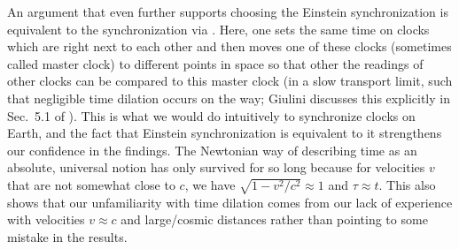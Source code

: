 \documentclass[../relativity_main.tex]{subfiles}
\begin{document}


An argument that even further supports choosing the Einstein synchronization is equivalent to the synchronization via . Here, one sets the same time on clocks which are right next to each other and then moves one of these clocks (sometimes called master clock) to different points in space so that other the readings of other clocks can be compared to this master clock (in a slow transport limit, such that negligible time dilation occurs on the way; Giulini discusses this explicitly in Sec.~5.1 of \cite{giulini_srt}). This is what we would do intuitively to synchronize clocks on Earth, and the fact that Einstein synchronization is equivalent to it strengthens our confidence in the findings. The Newtonian way of describing time as an absolute, universal notion has only survived for so long because for velocities $v$ that are not somewhat close to $c$, we have $\sqrt{1 - v^2 / c^2} \approx 1$ and $\tau \approx t$. This also shows that our unfamiliarity with time dilation comes from our lack of experience with velocities $v \approx c$ and large/cosmic distances rather than pointing to some mistake in the results.\\
\end{document}
